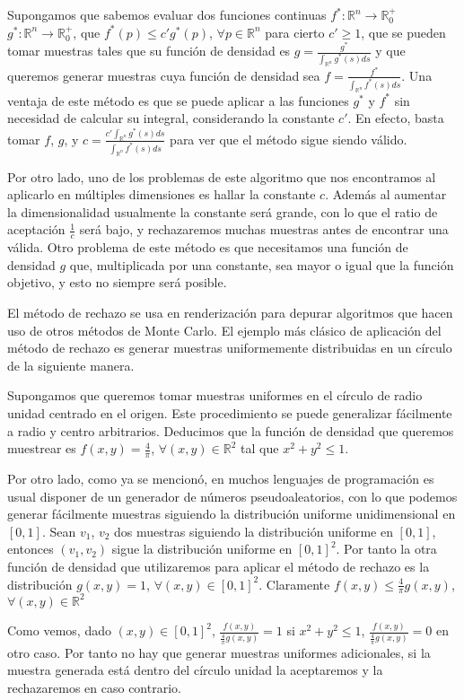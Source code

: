 Supongamos que sabemos evaluar dos funciones continuas $f^*:\mathds{R}^n\rightarrow \mathds{R}_0^+$ $g^*:\mathds{R}^n\rightarrow \mathds{R}_0^+$, que $f^*(p)\leq c' g^*(p)$, $\forall p\in\mathds{R}^n$ para cierto $c'\geq 1$, que se pueden tomar muestras tales que su función de densidad es $g = \frac{g^*}{\int_{\mathds{R}^n}g^*(s)ds} $ y que queremos generar muestras cuya función de densidad sea $f = \frac{f^*}{\int_{\mathds{R}^n}f^*(s)ds}$. Una ventaja de este método es que se puede aplicar a las funciones $g^*$ y $f^*$ sin necesidad de calcular su integral, considerando la constante $c'$. En efecto, basta tomar $f$, $g$, y $c=\frac{c'\int_{\mathds{R}^n}g^*(s)ds}{\int_{\mathds{R}^n}f^*(s)ds}$ para ver que el método sigue siendo válido.

Por otro lado, uno de los problemas de este algoritmo que nos encontramos al aplicarlo en múltiples dimensiones es hallar la constante $c$. Además al aumentar la dimensionalidad usualmente la constante será grande, con lo que el ratio de aceptación $\frac{1}{c}$ será bajo, y rechazaremos muchas muestras antes de encontrar una válida. Otro problema de este método es que necesitamos una función de densidad $g$ que, multiplicada por una constante, sea mayor o igual que la función objetivo, y esto no siempre será posible.

El método de rechazo se usa en renderización para depurar algoritmos que hacen uso de otros métodos de Monte Carlo. El ejemplo más clásico de aplicación del método de rechazo es generar muestras uniformemente distribuidas en un círculo de la siguiente manera.

\begin{ejemplo}
Supongamos que queremos tomar muestras uniformes en el círculo de radio unidad centrado en el origen. Este procedimiento se puede generalizar fácilmente a radio y centro arbitrarios. Deducimos que la función de densidad que queremos muestrear es $f(x,y) = \frac{4}{\pi}$, $\forall (x,y)\in\mathds{R}^2$ tal que $x^2+y^2\leq 1$.

Por otro lado, como ya se mencionó, en muchos lenguajes de programación es usual disponer de un generador de números pseudoaleatorios, con lo que podemos generar fácilmente muestras siguiendo la distribución uniforme unidimensional en $[0,1]$. Sean $v_1$, $v_2$ dos muestras siguiendo la distribución uniforme en $[0,1]$, entonces $(v_1,v_2)$ sigue la distribución uniforme en $[0,1]^2$. Por tanto la otra función de densidad que utilizaremos para aplicar el método de rechazo es la distribución $g(x,y) = 1$, $\forall (x,y)\in [0,1]^2$. Claramente $f(x,y)\leq \frac{4}{\pi}g(x,y)$, $\forall (x,y)\in \mathds{R}^2$

Como vemos, dado $(x,y)\in [0,1]^2$, $\frac{f(x,y)}{\frac{4}{\pi}g(x,y)} = 1$ si $x^2+y^2\leq 1$, $\frac{f(x,y)}{\frac{4}{\pi}g(x,y)} = 0$ en otro caso. Por tanto no hay que generar muestras uniformes adicionales, si la muestra generada está dentro del círculo unidad la aceptaremos y la rechazaremos en caso contrario.
\end{ejemplo}

